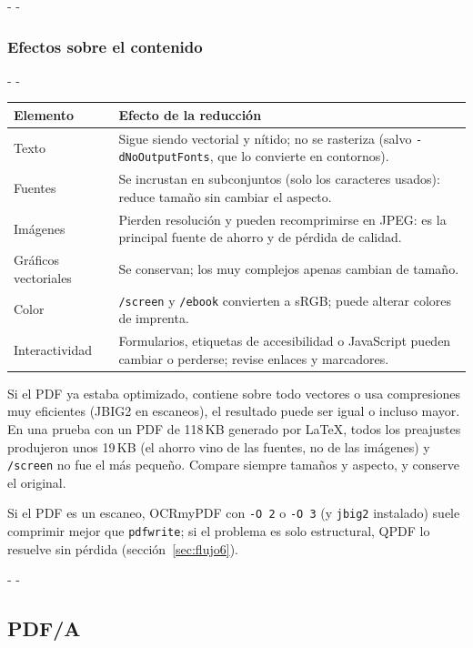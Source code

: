\documentclass[11pt,a4paper]{article}
\makeatletter
\newcommand{\necesitaespacio}[1]{\par\penalty-100\begingroup
	\setlength{\dimen@}{#1}\dimen@ii\pagegoal\advance\dimen@ii-\pagetotal
	\ifdim\dimen@>\dimen@ii\ifdim\dimen@ii>\z@\vfil\fi\penalty-\@M\fi\endgroup}
\newcommand{\opt}[1]{\texttt{\textcolor{colopt}{#1}}}      %
\newcommand{\val}[1]{\texttt{#1}}                          %
\newcommand{\cab}[1]{\textbf{#1}}
\makeatother
\begin{document}
	\necesitaespacio{24\baselineskip}
	\subsubsection{Efectos sobre el contenido}
	
	\begingroup\small
	\necesitaespacio{20\baselineskip}
	\begin{longtable}{L{2.8cm}L{12.26cm}}
		\toprule{}\cab{Elemento} & \cab{Efecto de la reducción}\\\midrule
		\endfirsthead
		\bottomrule
		\endfoot
		Texto & Sigue siendo vectorial y nítido; no se rasteriza (salvo \opt{-dNoOutputFonts}, que lo convierte en contornos).\\*
		Fuentes & Se incrustan en subconjuntos (solo los caracteres usados): reduce tamaño sin cambiar el aspecto.\\
		Imágenes & Pierden resolución y pueden recomprimirse en JPEG: es la principal fuente de ahorro y de pérdida de calidad.\\
		Gráficos vectoriales & Se conservan; los muy complejos apenas cambian de tamaño.\\
		Color & \val{/screen} y \val{/ebook} convierten a sRGB; puede alterar colores de imprenta.\\*
		Interactividad & Formularios, etiquetas de accesibilidad o JavaScript pueden cambiar o perderse; revise enlaces y marcadores.\\
	\end{longtable}
	\endgroup
	
	\begin{advertencia}
		Si el PDF ya estaba optimizado, contiene sobre todo vectores o usa compresiones muy eficientes (JBIG2 en escaneos), el resultado puede ser igual o incluso mayor. En una prueba con un PDF de 118\,KB generado por LaTeX, todos los preajustes produjeron unos 19\,KB (el ahorro vino de las fuentes, no de las imágenes) y \val{/screen} no fue el más pequeño. Compare siempre tamaños y aspecto, y conserve el original.
	\end{advertencia}
	
	Si el PDF es un escaneo, OCRmyPDF con \opt{-O 2} o \opt{-O 3} (y \texttt{jbig2} instalado) suele comprimir mejor que \texttt{pdfwrite}; si el problema es solo estructural, QPDF lo resuelve sin pérdida (sección~\ref{sec:flujo6}).
	
	\necesitaespacio{8\baselineskip}
	\subsection{PDF/A}
	
\end{document}
